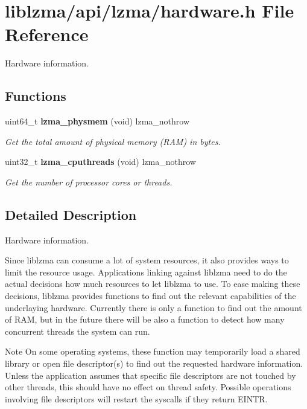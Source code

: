 \section{liblzma/api/lzma/hardware.h File Reference}
\label{liblzma_2api_2lzma_2hardware_8h}


Hardware information.  


\subsection*{Functions}
\begin{DoxyCompactItemize}
\item 
uint64\+\_\+t \textbf{ lzma\+\_\+physmem} (void) lzma\+\_\+nothrow
\begin{DoxyCompactList}\small\item\em Get the total amount of physical memory (R\+AM) in bytes. \end{DoxyCompactList}\item 
uint32\+\_\+t \textbf{ lzma\+\_\+cputhreads} (void) lzma\+\_\+nothrow
\begin{DoxyCompactList}\small\item\em Get the number of processor cores or threads. \end{DoxyCompactList}\end{DoxyCompactItemize}


\subsection{Detailed Description}
Hardware information. 

Since liblzma can consume a lot of system resources, it also provides ways to limit the resource usage. Applications linking against liblzma need to do the actual decisions how much resources to let liblzma to use. To ease making these decisions, liblzma provides functions to find out the relevant capabilities of the underlaying hardware. Currently there is only a function to find out the amount of R\+AM, but in the future there will be also a function to detect how many concurrent threads the system can run.

\begin{DoxyNote}{Note}
On some operating systems, these function may temporarily load a shared library or open file descriptor(s) to find out the requested hardware information. Unless the application assumes that specific file descriptors are not touched by other threads, this should have no effect on thread safety. Possible operations involving file descriptors will restart the syscalls if they return E\+I\+N\+TR. 
\end{DoxyNote}


